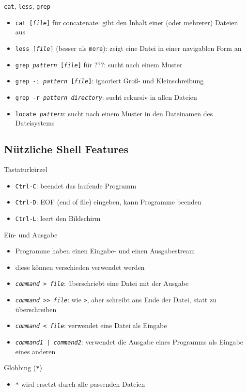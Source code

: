     \begin{frame}{\texttt{cat}, \texttt{less}, \texttt{grep}}
      \begin{itemize}
        \item \texttt{cat [\textit{file}]} für concatenate: gibt den Inhalt einer (oder mehrerer) Dateien aus
        \item \texttt{less [\textit{file}]} (besser als \texttt{more}): zeigt eine Datei in einer navigablen Form an
        \item \texttt{grep \textit{pattern} [\textit{file}]} für ???: sucht nach einem Muster
        \item \texttt{grep -i \textit{pattern} [\textit{file}]}: ignoriert Groß- und Kleinschreibung
        \item \texttt{grep -r \textit{pattern} \textit{directory}}: sucht rekursiv in allen Dateien
        \item \texttt{locate \textit{pattern}}: sucht nach einem Muster in den Dateinamen des Dateisystems
      \end{itemize}
    \end{frame}

  \subsection{Nützliche Shell Features}
    \begin{frame}{Tastaturkürzel}
      \begin{itemize}
        \item \texttt{Ctrl-C}: beendet das laufende Programm
        \item \texttt{Ctrl-D}: EOF (end of file) eingeben, kann Programme beenden
        \item \texttt{Ctrl-L}: leert den Bildschirm
      \end{itemize}
    \end{frame}

    \begin{frame}{Ein- und Ausgabe}
      \begin{itemize}
        \item Programme haben einen Eingabe- und einen Ausgabestream
        \item diese können verschieden verwendet werden
        \item \texttt{\textit{command} > \textit{file}}: überschriebt eine Datei mit der Ausgabe
        \item \texttt{\textit{command} >> \textit{file}}: wie \texttt{>}, aber schreibt ans Ende der Datei, statt zu überschreiben
        \item \texttt{\textit{command} < \textit{file}}: verwendet eine Datei als Eingabe
        \item \texttt{\textit{command1} | \textit{command2}}: verwendet die Ausgabe eines Programms als Eingabe eines anderen
      \end{itemize}
    \end{frame}

    \begin{frame}{Globbing (\texttt{*})}
      \begin{itemize}
        \item \texttt{*} wird ersetzt durch alle passenden Dateien
      \end{itemize}
    \end{frame}
